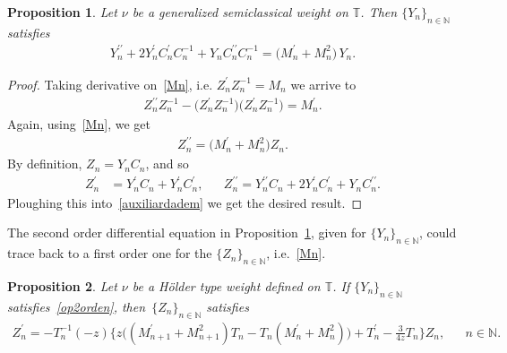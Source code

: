 \documentclass[12pt]{amsart}
\newtheorem{proposition}{Proposition}[section]
\begin{document}
\begin{proposition}%
\label{propeqdif2}
Let \(\nu \) be a
generalized
semiclassical weight on \( \mathbb T \).
Then \(\{ Y_n \}_{n \in \mathbb N} \)
 satisfies 
\begin{align}\label{op2orden}
 Y_n^{\prime\prime}+ 2Y_n^{\prime} C_n^{\prime}C_n^{-1}+Y_n C_n^{\prime\prime} C_n^{-1} = \big( {M}_n^{\prime}+ {M}_n^2 \big) \, Y_n.
\end{align}
\end{proposition}

\begin{proof}
Taking derivative on~\eqref{Mn}, i.e. \( Z_n^{\prime}Z_n^{-1} ={M}_n \) we arrive to
\begin{align*}
Z_n^{\prime\prime} Z_n^{-1} - \big( Z_n^{\prime}Z_n^{-1} \big) \big( Z_n^{\prime}Z_n^{-1} \big) = {M}_n^{\prime} .
\end{align*}
Again, using~\eqref{Mn}, we get
\begin{align}\label{auxiliardadem}
Z_n^{\prime\prime} = \big( {M}_n^{\prime} + M_n^2 \big) Z_n .
\end{align}
By definition, \( Z_n=Y_nC_n \), and so
\begin{align*}
Z_n^{\prime}& =Y_n^{\prime}C_n+ Y_n^{\prime}C_n^{\prime} ,
 &&
Z_n^{\prime\prime} =Y_n^{\prime\prime}C_n+2Y_n^{\prime}C_n^{\prime}+Y_nC_n^{\prime\prime} .
\end{align*}
Ploughing this into~\eqref{auxiliardadem} we get the desired result.
\end{proof}

The second order differential equation in Proposition~\ref{propeqdif2}, given for \( \{Y_n\}_{n \in \mathbb N} \), could trace back to a first order one for the \( \{Z_n\}_{n \in \mathbb N} \), i.e.~\eqref{Mn}.

\begin{proposition}\label{novaprop} 
Let \( \nu \) be a H\"older type weight defined on \( \mathbb T \).
If \(\{ Y_n \}_{n \in \mathbb N} \) satisfies~\eqref{op2orden}, then~\( \{ Z_n \}_{n \in \mathbb N} \) satisfies
\begin{align}
\label{eq:semic}
Z_n^\prime = -T_n^{-1} (-z) \Big\{ z \big( (M_{n+1}^\prime + M_{n+1}^2)T_n - T_n (M_{n}^\prime + M_{n}^2) \big) + T_n^\prime - \frac 3 {4z} T_n \Big\} Z_n , && n \in \mathbb N .
\end{align}
\end{proposition}
\end{document}
